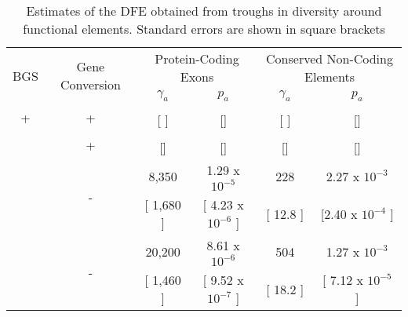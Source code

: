 

\begin{table}[h]
\caption{Estimates of the DFE obtained from troughs in diversity around functional elements. Standard errors are shown in square brackets}
\centering

        \begin{tabular}{cccccc}

        \hline
             \multirow{2}{*}{BGS}& \multirow{2}{*}{Gene Conversion} & \multicolumn{2}{c}{Protein-Coding Exons} & \multicolumn{2}{c}{Conserved Non-Coding Elements}  \\
 & & $\gamma_a$ & $p_a$ &$\gamma_a$ & $p_a$  \\ [0.5ex] \hline
 
 \multirow{2}{*}{+} & \multirow{2}{*}{+} & & & &  \\
   &  &  [ ]& []& [  ] & []\\ \hdashline
 
 \multirow{2}{*}{-} & \multirow{2}{*}{+} &   &  & & \\
   &  &  []& []& [] & []\\ \hdashline

 \multirow{2}{*}{+} & \multirow{2}{*}{-} &  8,350 & 1.29 x $10^{-5}$ & 228 & 2.27 x $10^{-3}$ \\
   &  &  [ 1,680 ]& [ 4.23 x $10^{-6}$ ]& [ 12.8 ] & [2.40 x $10^{-4}$ ]\\ \hdashline
   
 \multirow{2}{*}{-} & \multirow{2}{*}{-} &  20,200 & 8.61 x $10^{-6}$ & 504 & 1.27 x $10^{-3}$ \\
  &  & [ 1,460 ] & [ 9.52 x $10^{-7}$ ]& [ 18.2 ] & [ 7.12 x $10^{-5}$ ]\\ \hline

        \end{tabular}
    \label{tab:Table1}
    
\end{table}

